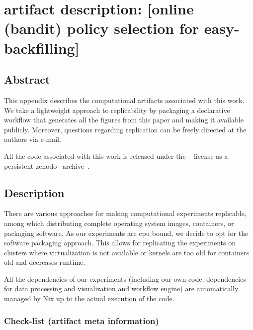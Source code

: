\documentclass[sigconf,anonymous]{acmart}
\begin{document}



\clearpage

\section{artifact description: [online (bandit) policy selection for easy-backfilling]}

\subsection{Abstract}

This appendix describes the computational artifacts associated with this work. We
take a lightweight approach to replicability by packaging a declarative
workflow that generates all the figures from this paper and making it available
publicly. Moreover, questions regarding replication can be freely directed at
the authors via e-mail.

All the code associated with this work is released under the ~\cite{isc}
license as a persistent zenodo~\cite{zenodo} archive~\cite{repro}.

\subsection{Description}

There are various approaches for making computational experiments replicable,
among which distributing complete operating system images, containers, or
packaging software. As our experiments are cpu bound, we decide to opt for the
software packaging approach. This allows for replicating the experiments on clusters where virtualization is not
available or kernels are too old for containers old and decreases runtime.

All the dependencies of our
experiments (including our own code, dependencies for data processing and
visualization and workflow engine) are automatically managed by Nix up to the
actual execution of the code.

\subsubsection{Check-list (artifact meta information)}
\end{document}
